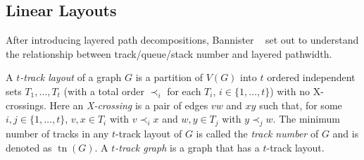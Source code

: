 \documentclass{patmorin}
\DeclareMathOperator{\tr}{tn}
\begin{document}


\subsection{Linear Layouts}

After introducing layered path decompositions, Bannister \etal\ \cite{DBLP:conf/gd/BannisterDDEW16,bannister2018track} set
out to understand the relationship between track/queue/stack number and
layered pathwidth.

A \emph{$t$-track layout} of a graph
$G$ is a partition of $V(G)$ into $t$ ordered independent sets $T_1,\ldots,T_t$ (with a total order $\prec_i$ for each $T_i$, $i\in\{1,\ldots,t\}$) with no X-crossings. Here an \emph{X-crossing} is a pair of edges $vw$ and $xy$ such that, for some $i,j\in\{1,\ldots,t\}$, $v,x\in T_i$ with $v\prec_i x$ and $w,y\in T_j$ with $y\prec_j w$. The minimum number of tracks in any $t$-track layout of $G$ is called the \emph{track number} of $G$ and is denoted as $\tr(G)$. A \emph{$t$-track graph} is a graph that has a $t$-track layout.
\end{document}
